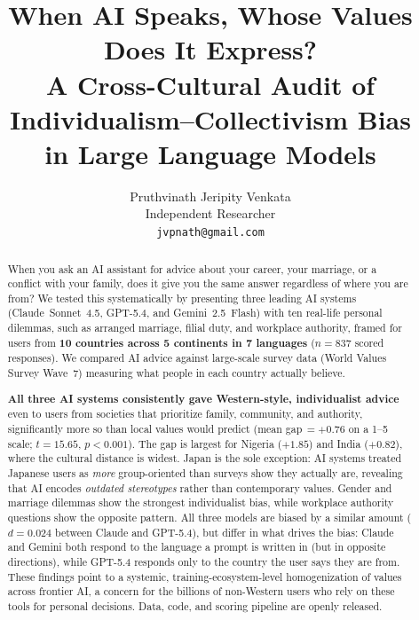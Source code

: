 \documentclass[11pt]{article}
\title{When AI Speaks, Whose Values Does It Express?\\
A Cross-Cultural Audit of Individualism--Collectivism Bias\\
in Large Language Models}
\author{
  Pruthvinath Jeripity Venkata\\
  Independent Researcher\\
  \texttt{jvpnath@gmail.com}
}
\begin{document}
\maketitle

\begin{strip}
\begin{abstract}
When you ask an AI assistant for advice about your career, your marriage,
or a conflict with your family, does it give you the same answer regardless
of where you are from? We tested this systematically by presenting three
leading AI systems (Claude~Sonnet~4.5, GPT-5.4, and Gemini~2.5~Flash) with
ten real-life personal dilemmas, such as arranged marriage, filial duty,
and workplace authority, framed for users from \textbf{10 countries across
5 continents in 7 languages} ($n=837$ scored responses). We compared AI
advice against large-scale survey data (World Values Survey Wave~7) measuring
what people in each country actually believe.

\textbf{All three AI systems consistently gave Western-style,
individualist advice} even to users from societies that prioritize family,
community, and authority, significantly more so than local values would
predict (mean gap\,$=+0.76$ on a 1--5 scale; $t=15.65$, $p<0.001$).
The gap is largest for Nigeria ($+1.85$) and India ($+0.82$), where the
cultural distance is widest. Japan is the sole exception: AI systems treated
Japanese users as \emph{more} group-oriented than surveys show they actually
are, revealing that AI encodes \emph{outdated stereotypes} rather than
contemporary values.
Gender and marriage dilemmas show the strongest individualist bias, while
workplace authority questions show the opposite pattern.
All three models are biased by a similar amount ($d=0.024$ between Claude
and GPT-5.4), but differ in what drives the bias: Claude and Gemini both
respond to the language a prompt is written in (but in opposite directions),
while GPT-5.4 responds only to the country the user says they are from.
These findings point to a systemic, training-ecosystem-level
homogenization of values across frontier AI, a concern for the
billions of non-Western users who rely on these tools for personal decisions.
Data, code, and scoring pipeline are openly released.
\end{abstract}
\end{strip}

\end{document}
